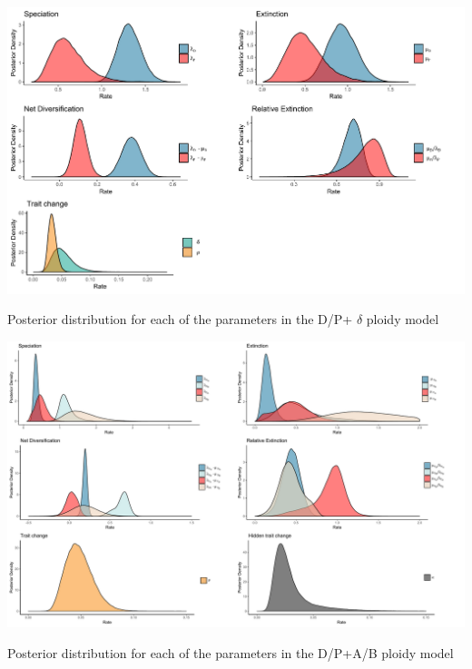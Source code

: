 
\begin{suppfigure}
\includegraphics[width=\textwidth]{bisseDPposteriordist.pdf}
\caption{Posterior distribution for each of the parameters in the D/P+ $\delta$ ploidy model} %
\label{suppfigure:DP}
\end{suppfigure}


\begin{suppfigure}
\includegraphics[width=\textwidth]{hisseDPnodipposteriordist.pdf}
\caption{Posterior distribution for each of the parameters in the D/P+A/B ploidy model} %
\label{suppfigure:DPnodipAB}
\end{suppfigure}


